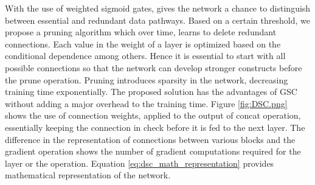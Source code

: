 \documentclass{article}
\begin{document}
With the use of weighted sigmoid gates, gives the network a chance to distinguish between essential and redundant data pathways. Based on a certain threshold, we propose a pruning algorithm which over time, learns to delete redundant connections. Each value in the weight of a layer is optimized based on the conditional dependence among others. Hence it is essential to start with all possible connections so that the network can develop stronger constructs before the prune operation. Pruning introduces sparsity in the network, decreasing training time exponentially. The proposed solution has the advantages of GSC without adding a major overhead to the training time. Figure \ref{fig:DSC.png} shows the use of connection weights, applied to the output of concat operation, essentially keeping the connection in check before it is fed to the next layer. The difference in the representation of connections between various blocks and the gradient operation shows the number of gradient computations required for the layer or the operation. Equation \ref{eq:dsc_math_representation} provides mathematical representation of the network.
\end{document}
